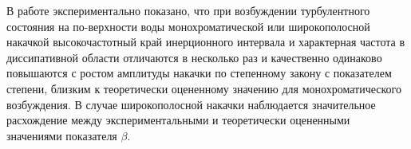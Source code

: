 В работе экспериментально показано, что при возбуждении турбулентного состояния на по-верхности воды монохроматической или широкополосной накачкой высокочастотный край инерционного интервала и характерная частота в диссипативной области отличаются в несколько раз и качественно одинаково повышаются с ростом амплитуды накачки по степенному закону с показателем степени, близким к теоретически оцененному значению для монохроматического возбуждения. В случае широкополосной накачки наблюдается значительное расхождение между экспериментальными и теоретически оцененными значениями показателя $\beta$.


%
%
